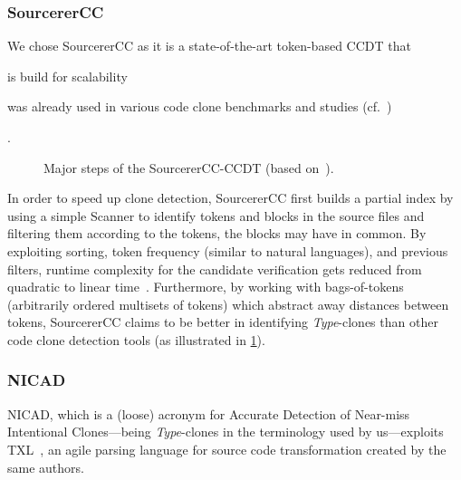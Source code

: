 \documentclass[10pt,journal,compsoc]{IEEEtran}
\def\T#1{\textsl{Type\nobreakdash-#1}}
\begin{document}
\subsubsection{SourcererCC}\label{SourcererCC}
We chose SourcererCC as it is a state-of-the-art token-based CCDT that \begin{inlist}
  \item is build for scalability
  \item was already used in various code clone benchmarks and studies (cf.~\cite{10.1145/3133908,ain2019systematic,su2016code})
\end{inlist}.

\begin{figure}
\caption{Major steps of the SourcererCC-CCDT (based on~\cite[Figure 2]{SourcererCC}).}
\label{fig:steps-sourcerercc}
\end{figure}

In order to speed up clone detection, SourcererCC first builds a partial index by using a simple Scanner to identify tokens and blocks in the source files and filtering them according to the tokens, the blocks may have in common.
By exploiting sorting, token frequency (similar to natural languages), and previous filters, runtime complexity for the candidate verification gets reduced from quadratic to linear time~\cite{SourcererCC}.
Furthermore, by working with bags-of-tokens (arbitrarily ordered multisets of tokens) which abstract away distances between tokens, SourcererCC claims to be better in identifying \T3-clones than other code clone detection tools (as illustrated in \cref{fig:steps-sourcerercc}).


\subsubsection{NICAD}
NICAD, which is a (loose) acronym for Accurate Detection of Near-miss Intentional Clones---being \T3-clones in the terminology used by us---exploits TXL~\cite{cordy2006txl}, an agile parsing language for source code transformation created by the same authors.
\end{document}
